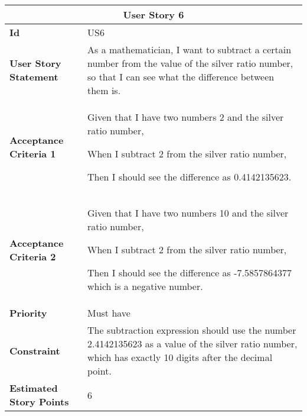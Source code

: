 \hspace{1cm}
\begin{center}
\begin{tabular}{ | m{2cm} | m{12cm} | } 

 \hline
 \multicolumn{2}{|c|}{\textbf{User Story 6}} \\

\hline
\textbf{Id} & US6 \\ 

\hline
\textbf{User Story Statement} & As a mathematician, I want to subtract a certain number from the value of the silver ratio number, so that I can see what the difference between them is.\\ 

\hline
\textbf{Acceptance Criteria 1} & Given that I have two numbers 2 and the silver ratio number, 

When I subtract 2 from the silver ratio number,

Then I should see the difference as 0.4142135623.\\ 

\hline
\textbf{Acceptance Criteria 2} & Given that I have two numbers 10 and the silver ratio number, 

When I subtract 2 from the silver ratio number,

Then I should see the difference as -7.5857864377 which is a negative number.\\

\hline
\textbf{Priority} & Must have \\ 

\hline
\textbf{Constraint} & The subtraction expression should use the number 2.4142135623 as a value of the silver ratio number, which has exactly 10 digits after the decimal point.\\ 

\hline
\textbf{Estimated Story Points} & 6 \\ 
\hline

\end{tabular}
\end{center}

